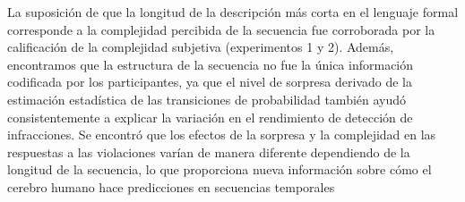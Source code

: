 La suposición de que la longitud de la descripción más corta en el lenguaje formal corresponde a la complejidad percibida de la secuencia fue corroborada por la calificación de la complejidad subjetiva (experimentos 1 y 2). Además, encontramos que la estructura de la secuencia no fue la única información codificada por los participantes, ya que el nivel de sorpresa derivado de la estimación estadística de las transiciones de probabilidad también ayudó consistentemente a explicar la variación en el rendimiento de detección de infracciones. Se encontró que los efectos de la sorpresa y la complejidad en las respuestas a las violaciones varían de manera diferente dependiendo de la longitud de la secuencia, lo que proporciona nueva información sobre cómo el cerebro humano hace predicciones en secuencias temporales


